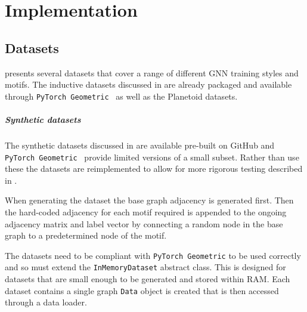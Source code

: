 \chapter{Implementation}

\section{Datasets}
\label{sec:datasets-imp}
 presents several datasets that cover a range of different GNN training styles and motifs.
The inductive datasets discussed in  are already packaged and available through \texttt{PyTorch Geometric}~\cite{Fey/Lenssen/2019} as well as the Planetoid\cite{planetoid}\cite{citation} datasets.

\paragraph{Synthetic datasets}
The synthetic datasets discussed in  are available pre-built on GitHub and \texttt{PyTorch Geometric}~\cite{Fey/Lenssen/2019} provide limited versions of a small subset.
Rather than use these the datasets are reimplemented to allow for more rigorous testing described in .

When generating the dataset the base graph adjacency is generated first. 
Then the hard-coded adjacency for each motif required is 
appended to the ongoing adjacency matrix and label vector by connecting
a random node in the base graph to a predetermined node of the motif.

The datasets need to be compliant with \texttt{PyTorch Geometric} to be used correctly and so must extend the \texttt{InMemoryDataset} abstract class. 
This is designed for datasets that are small enough to be generated and stored within RAM.
Each dataset contains a single graph \texttt{Data} object is created that is then accessed through a data loader.

